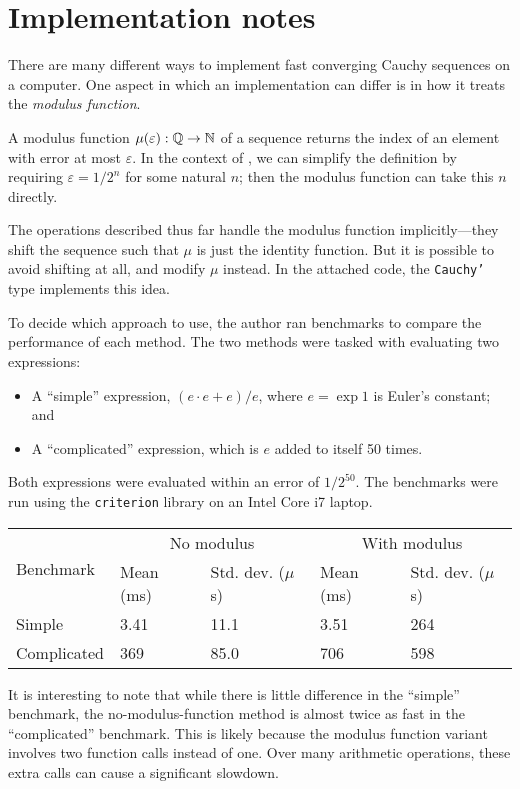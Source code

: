 \documentclass[leqno]{report}
\begin{document}
\chapter{Implementation notes}

There are many different ways to implement fast converging Cauchy sequences on a computer. One aspect in which an implementation can differ is in how it treats the \textit{modulus function}.

A modulus function $\mu(\varepsilon) : \mathbb{Q} \rightarrow \mathbb{N}$ of a sequence returns the index of an element with error at most $\varepsilon$. In the context of \FCCS, we can simplify the definition by requiring $\varepsilon = 1/2^n$ for some natural $n$; then the modulus function can take this $n$ directly.

The \FCCS{} operations described thus far handle the modulus function implicitly---they shift the sequence such that $\mu$ is just the identity function. But it is possible to avoid shifting at all, and modify $\mu$ instead. In the attached code, the \texttt{Cauchy'} type implements this idea.

To decide which approach to use, the author ran benchmarks to compare the performance of each method. The two methods were tasked with evaluating two expressions:
\begin{itemize}
    \item A ``simple'' expression, $(e \cdot e + e) / e$, where $e = \exp 1$ is Euler's constant; and
    \item A ``complicated'' expression, which is $e$ added to itself 50 times.
\end{itemize}

Both expressions were evaluated within an error of $1/2^{50}$. The benchmarks were run using the \texttt{criterion} library on an Intel Core i7 laptop.

\begin{tabular}{lllll}
    \toprule
    \multirow{2}{*}{Benchmark} &
    \multicolumn{2}{c}{No modulus} &
    \multicolumn{2}{c}{With modulus} \\
    \cmidrule(l){2-5}
    & Mean (ms) & Std. dev. ($\mu$s) & Mean (ms) & Std. dev. ($\mu$s) \\
    \midrule
    Simple & 3.41 & 11.1 & 3.51 & 264 \\
    Complicated & 369 & 85.0 & 706 & 598 \\
    \bottomrule
\end{tabular}

It is interesting to note that while there is little difference in the ``simple'' benchmark, the no-modulus-function method is almost twice as fast in the ``complicated'' benchmark. This is likely because the modulus function variant involves two function calls instead of one. Over many arithmetic operations, these extra calls can cause a significant slowdown.



\end{document}
